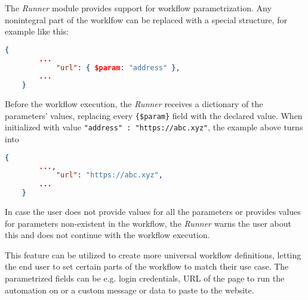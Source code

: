 The \textit{Runner} module provides support for workflow parametrization. 
Any nonintegral part of the worklfow can be replaced with a special structure, for example like this:
\begin{lstlisting}[language=json]
    {
        ...
            "url": { $param: "address" },
        ...
    }
\end{lstlisting}

Before the workflow execution, the \textit{Runner} receives a dictionary of the parameters' values, replacing every \texttt{\{\$param\}} field with the declared value.
When initialized with value \texttt{"address" : "https://abc.xyz"}, the example above turns into

\begin{lstlisting}[language=json]
    {
        ...,
            "url": "https://abc.xyz",
        ...
    }
\end{lstlisting}

In case the user does not provide values for all the parameters or provides values for parameters non-existent in the workflow, the \textit{Runner} warns the user about this and does not continue with the workflow execution.

This feature can be utilized to create more universal workflow definitions, letting the end user to set certain parts of the workflow to match their use case.
The parametrized fields can be e.g. login credentials, URL of the page to run the automation on or a custom message or data to paste to the website.